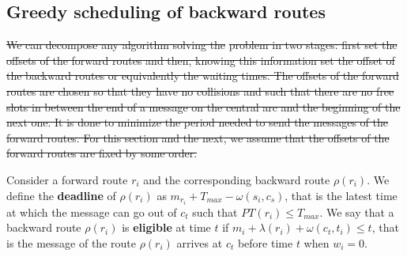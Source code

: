 \documentclass[10pt, conference, letterpaper]{IEEEtran}
\newcommand\pall{\textsc{pall}\xspace}
\providecommand{\DIFdeltex}[1]{{\protect\color{red}\sout{#1}}}                      %
\providecommand{\DIFdelbegin}{} %
\providecommand{\DIFdelend}{} %
\providecommand{\DIFdel}[1]{\texorpdfstring{\DIFdeltex{#1}}{}} %
\newcommand{\DIFscaledelfig}{0.5}
\newlength{\DIFdelgraphicswidth} %
\newlength{\DIFdelgraphicsheight} %
\newcommand{\DIFdelincludegraphics}[2][]{%
\sbox{\DIFdelgraphicsbox}{\DIFOincludegraphics[#1]{#2}}%
\settoboxwidth{\DIFdelgraphicswidth}{\DIFdelgraphicsbox} %
\settoboxtotalheight{\DIFdelgraphicsheight}{\DIFdelgraphicsbox} %
\scalebox{\DIFscaledelfig}{%
\parbox[b]{\DIFdelgraphicswidth}{\usebox{\DIFdelgraphicsbox}\\[-\baselineskip] \rule{\DIFdelgraphicswidth}{0em}}\llap{\resizebox{\DIFdelgraphicswidth}{\DIFdelgraphicsheight}{%
\setlength{\unitlength}{\DIFdelgraphicswidth}%
\begin{picture}(1,1)%
\thicklines\linethickness{2pt} %
{\color[rgb]{1,0,0}\put(0,0){\framebox(1,1){}}}%
{\color[rgb]{1,0,0}\put(0,0){\line( 1,1){1}}}%
{\color[rgb]{1,0,0}\put(0,1){\line(1,-1){1}}}%
\end{picture}%
}\hspace*{3pt}}} %
} %
\DeclareRobustCommand{\DIFdelbegin}{\DIFOdelbegin \let\includegraphics\DIFdelincludegraphics} %
\DeclareRobustCommand{\DIFdelend}{\DIFOaddend \let\includegraphics\DIFOincludegraphics} %
\begin{document}
   \subsection{Greedy scheduling of backward routes}

    \DIFdelbegin \DIFdel{We can decompose any algorithm solving the }%
\DIFdel{problem in two stages: first set the offsets of the forward routes and then, knowing this information set the offset of the backward routes or equivalently the waiting times.  
    The offsets of the forward routes are chosen so that they have no collisions and such that there are no free slots in between the end of a message on the central arc and the beginning of the next one. 
    It is done to minimize the period needed to send the messages of the forward routes. For this section and the next, we assume that the offsets of the forward routes are fixed by some order. 
    }%

\DIFdelend Consider a forward route $r_i$ and the corresponding backward route $\rho(r_i)$.
    We define the {\bf deadline} of $\rho(r_i)$ as $m_{r_i} + T_{max} - \omega(s_i,c_s)$, that is the latest time at which the message can go out of $c_t$ such that $PT(r_i) \leq T_{max}$.
    We say that a backward route $\rho(r_i)$ is {\bf eligible} at time $t$ if $m_{i} +  \lambda(r_i) + \omega(c_t,t_i) \leq t$, that is the message of the route $\rho(r_i)$ arrives at $c_t$ before time $t$ when $w_i = 0$.
\end{document}
